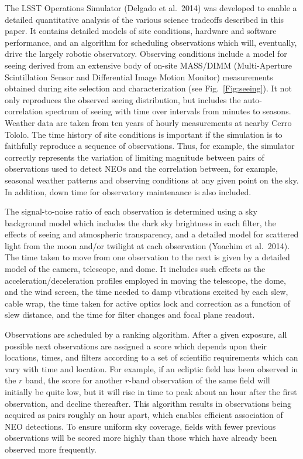 {The LSST Operations Simulator (Delgado et al.~2014) was developed to enable a 
detailed quantitative analysis of the various science tradeoffs described in 
this paper. It contains detailed models of site conditions, hardware and
software performance, and an algorithm for scheduling observations which will, 
eventually, drive the largely robotic observatory. 
Observing conditions include a model for seeing derived from an extensive body
of on-site MASS/DIMM (Multi-Aperture Scintillation Sensor and Differential
Image Motion Monitor) measurements obtained during site selection and
characterization (see Fig.~\ref{Fig:seeing}). It not only reproduces the 
observed seeing distribution, but includes 
the auto-correlation spectrum of seeing with time over intervals from minutes 
to seasons. Weather data are taken from ten years of hourly measurements at
nearby Cerro Tololo. The time history of site conditions is important if the 
simulation is to faithfully reproduce a sequence of observations. Thus, for
example, the simulator correctly represents the variation of limiting
magnitude between pairs of observations used to detect NEOs and the
correlation between, for example, seasonal weather patterns and observing
conditions at any given point on the sky.  In addition, down time for
observatory maintenance is also included. 

The signal-to-noise ratio of each 
observation is determined using a sky background model which includes the dark
sky brightness in each filter, the effects of seeing and atmospheric
transparency, and a detailed model for scattered light from the moon and/or 
twilight at each observation (Yoachim et al.~2014). The time taken to move from one observation to
the next is given by a detailed model of the camera, telescope, and dome. It 
includes such effects as the acceleration/deceleration profiles employed in 
moving the telescope, the dome, and the wind screen, 
the time needed to damp vibrations excited by each slew, 
cable wrap, the time taken for active optics lock and correction as a function of 
slew distance, and the time for filter changes and focal plane readout. 

Observations are scheduled by a ranking algorithm. After a given exposure, all 
possible next observations are assigned a score which depends upon their locations, times,
and filters according to a set of scientific requirements which can vary with 
time and location. For example, if an ecliptic field has been observed in the
$r$ band, the score for another $r$-band observation of the same field will 
initially be quite low, but it will rise in time to peak about an hour after
the first observation, and decline thereafter. This algorithm results in
observations being acquired as pairs roughly an hour apart, which enables
efficient association of NEO detections. To ensure uniform 
sky coverage, fields with fewer previous observations will be scored more
highly than those which have already been observed more frequently.
 
}

